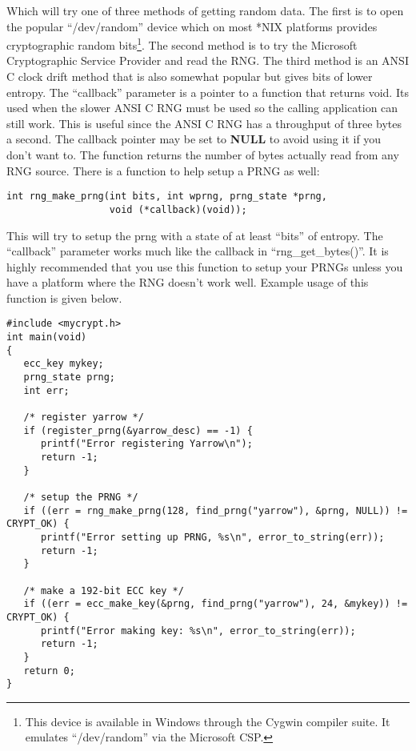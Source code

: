 \documentclass[b5paper]{book}
\begin{document}
Which will try one of three methods of getting random data.  The first is to open the popular ``/dev/random'' device which 
on most *NIX platforms provides cryptographic random bits\footnote{This device is available in Windows through the Cygwin compiler suite.  It emulates ``/dev/random'' via the Microsoft CSP.}.  
The second method is to try the Microsoft Cryptographic Service Provider and read the RNG.  The third method is an ANSI C 
clock drift method that is also somewhat popular but gives bits of lower entropy.  The ``callback'' parameter is a pointer to a function that returns void.  Its used when the slower ANSI C RNG must be 
used so the calling application can still work.  This is useful since the ANSI C RNG has a throughput of three 
bytes a second.  The callback pointer may be set to {\bf NULL} to avoid using it if you don't want to.  The function 
returns the number of bytes actually read from any RNG source.  There is a function to help setup a PRNG as well:
\begin{verbatim}
int rng_make_prng(int bits, int wprng, prng_state *prng, 
                  void (*callback)(void));
\end{verbatim}
This will try to setup the prng with a state of at least ``bits'' of entropy.  The ``callback'' parameter works much like
the callback in ``rng\_get\_bytes()''.  It is highly recommended that you use this function to setup your PRNGs unless you have a
platform where the RNG doesn't work well.  Example usage of this function is given below.

\begin{small}
\begin{verbatim}
#include <mycrypt.h>
int main(void)
{
   ecc_key mykey;
   prng_state prng;
   int err;

   /* register yarrow */
   if (register_prng(&yarrow_desc) == -1) {
      printf("Error registering Yarrow\n");
      return -1;
   }

   /* setup the PRNG */
   if ((err = rng_make_prng(128, find_prng("yarrow"), &prng, NULL)) != CRYPT_OK) {
      printf("Error setting up PRNG, %s\n", error_to_string(err));
      return -1;
   }

   /* make a 192-bit ECC key */
   if ((err = ecc_make_key(&prng, find_prng("yarrow"), 24, &mykey)) != CRYPT_OK) {
      printf("Error making key: %s\n", error_to_string(err));
      return -1;
   }
   return 0;
}
\end{verbatim}
\end{small}
\end{document}
